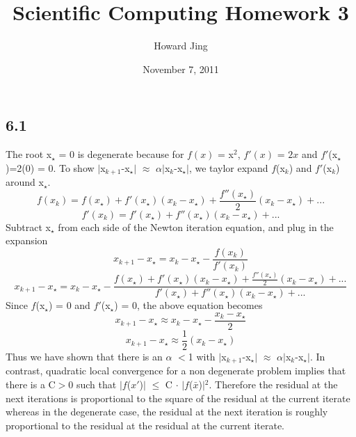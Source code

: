 \documentclass[11pt]{amsart}
\title{Scientific Computing Homework 3}
\author{Howard Jing}
\date{November 7, 2011}                                           %
\begin{document}
\maketitle
\subsection*{6.1}

The root x$_{\star}$ = 0 is degenerate because for $f(x)$ = x$^{2}$, $f'(x)$ = $2x$ and $f'$(x$_{\star}$)=2(0) = 0. To show $|$x$_{k+1}$-x$_{\star}$$|$ $\approx$ $\alpha$$|$x$_{k}$-x$_{\star}$$|$, we taylor expand $f$(x$_{k}$) and $f'$(x$_{k}$) around x$_{\star}$. 
\[
f(x_{k}) = f(x_{\star})+f'(x_{\star})(x_{k}-x_{\star})+\frac{f''(x_{\star})}{2}(x_{k}-x_{\star})+ ...
\]
\[
f'(x_{k}) = f'(x_{\star})+f''(x_{\star})(x_{k}-x_{\star})+...
\]
\newline
Subtract x$_{\star}$ from each side of the Newton iteration equation, and plug in the expansion 
\[
x_{k+1}-x_{\star}=x_{k}-x_{\star}-\frac{f(x_{k})}{f'(x_{k})}
\]
\[
x_{k+1}-x_{\star} = x_{k}-x_{\star}-\frac{f(x_{\star})+f'(x_{\star})(x_{k}-x_{\star})+\frac{f''(x_{\star})}{2}(x_{k}-x_{\star})+ ...}{f'(x_{\star})+f''(x_{\star})(x_{k}-x_{\star})+...}
\]
\newline
Since $f$(x$_{\star}$) = 0 and $f'$(x$_{\star}$) = 0, the above equation becomes
\[
x_{k+1}-x_{\star} \approx x_{k}-x_{\star}-\frac{x_{k}-x_{\star}}{2}
\]
\[
x_{k+1}-x_{\star} \approx \frac{1}{2}(x_{k}-x_{\star})
\]
\newline
Thus we have shown that there is an $\alpha$ $<$1 with $|$x$_{k+1}$-x$_{\star}$$|$ $\approx$ $\alpha$$|$x$_{k}$-x$_{\star}$$|$.
\newline
\newline
In contrast, quadratic local convergence for a non degenerate problem implies that there is a C$>$0 such that $|$$f$($x$$'$)$|$ $\le$ C $\cdot$ $|$$f$($\bar{x}$)$|$$^{2}$. Therefore the residual at the next iterations is proportional to the square of the residual at the current iterate whereas in the degenerate case, the residual at the next iteration is roughly proportional to the residual at the residual at the current iterate. 
\end{document}
